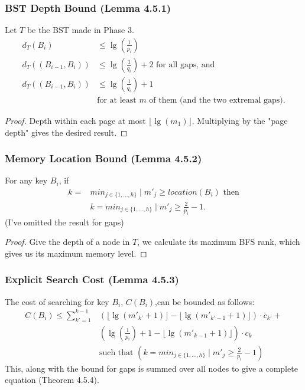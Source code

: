 \documentclass{beamer}
\theoremstyle{plain}
\begin{document}
\begin{frame}\frametitle{BST Depth Bound (Lemma 4.5.1)}
Let $T$ be the BST made in Phase 3.
\begin{align*} 
d_T(B_i) &\leq \lg \left(\frac{1}{p_i}\right) \\
d_T((B_{i-1},B_i)) &\leq \lg \left(\frac{1}{q_i} \right) + 2 \text{ for all gaps, and} \\
d_T((B_{i-1},B_i)) &\leq \lg \left(\frac{1}{q_i} \right) + 1 \\
&\text{for at least  $m$ of them (and the two extremal gaps).}
\end{align*}
\begin{proof}
Depth within each page at most $\lfloor \lg(m_1) \rfloor$. Multiplying by the "page depth" gives the desired result.
\end{proof}

\end{frame}

\begin{frame}\frametitle{Memory Location Bound (Lemma 4.5.2)}
For any key $B_i$, if
\begin{align*}
k=&min_{j \in \{1, ..., h\}} \mid m'_j \geq location(B_i) \text{ then} \\
&k=min_{j \in \{1, ..., h\}} \mid m'_j \geq \frac{2}{p_i}-1.
\end{align*}
(I've omitted the result for gaps)
\begin{proof}
Give the depth of a node in $T$, we calculate its maximum BFS rank, which gives us its maximum memory level.
\end{proof}
\end{frame}

\begin{frame}\frametitle{Explicit Search Cost (Lemma 4.5.3)}
The cost of searching for key $B_i$, $C(B_i)$,can be bounded as follows: 
\begin{align*} 
C(B_i) \leq  \sum_{k'=1}^{k-1} &\left(\lfloor \lg(m'_{k'}+1) \rfloor - \lfloor \lg(m'_{k'-1}+1) \rfloor \right)\cdot c_{k'} + \\
 &\left(\lg(\frac{1}{p_i}) + 1 - \lfloor \lg(m'_{k-1}+1) \rfloor \right)\cdot c_k \\
&\text{such that } \left( k=min_{j \in \{1, ..., h\}} \mid m'_j \geq \frac{2}{p_i}-1 \right) 
\end{align*}
This, along with the bound for gaps is summed over all nodes to give a complete equation (Theorem 4.5.4).
\end{frame}
\end{document}
